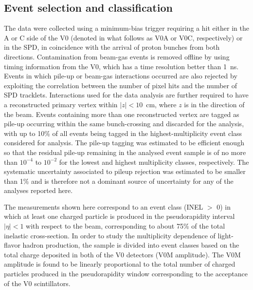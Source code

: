 \subsection{\label{subsecEventSelection}Event selection and classification}

The data were collected using a minimum-bias trigger requiring a hit either in the A or C side of the V0 (denoted in what follows as V0A or V0C, respectively) or in the SPD, in coincidence with the arrival of proton bunches from both directions. Contamination from beam-gas events is removed offline by using timing information from the V0, which has a time resolution better than 1~ns. Events in which pile-up or beam-gas interactions occurred are also rejected by exploiting the correlation between the number of pixel hits and the number of SPD tracklets. Interactions used for the data analysis are further required to have a reconstructed primary vertex within $|z| < 10$~cm, where $z$ is in the direction of the beam. Events containing more than one reconstructed vertex are tagged as pile-up occurring within the same
 bunch-crossing and discarded for the analysis, with up to 10\% of all events being tagged in the highest-multiplicity event class considered for analysis. The pile-up tagging was estimated to be efficient enough so that the residual pile-up remaining in the 
analysed event sample is of no more than $10^{-4}$ to $10^{-2}$ for the lowest and highest multiplicity classes, respectively. The systematic uncertainty associated to pileup rejection was estimated to be smaller than 1\% and is therefore not a dominant source of uncertainty for any of the analyses reported here. 

The measurements shown here correspond to an event class (INEL $>$ 0) in which at least one charged particle is produced in the pseudorapidity interval $|\eta| < 1$ with respect to the beam, corresponding to about 75\% of the total inelastic cross-section. In order to study the multiplicity dependence of light-flavor hadron production, the sample is divided into event classes based on the total charge deposited in both of the V0 detectors (V0M amplitude). 
The V0M amplitude is found to be linearly proportional to the total number of charged particles produced in the pseudorapidity window corresponding to the acceptance of the V0 scintillators.

